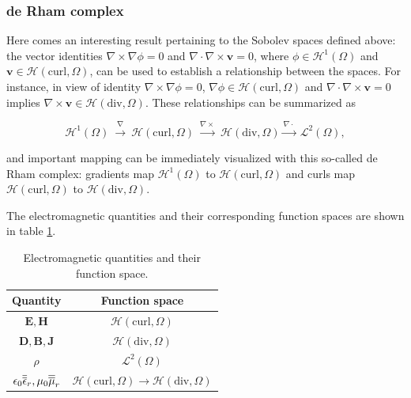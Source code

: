 \subsubsection{de Rham complex}
%
Here comes an interesting result pertaining to the Sobolev spaces defined above: the vector identities $\nabla \times \nabla \phi = 0$ and $\nabla \cdot \nabla \times \mathbf{v} = 0$, where $\phi \in \mathcal{H}^1(\Omega)$ and $\mathbf{v} \in \mathcal{H}(\mathrm{curl},\Omega)$, can be used to establish a relationship between the spaces. For instance, in view of identity $\nabla \times \nabla \phi = 0$, $\nabla \phi \in \mathcal{H}(\mathrm{curl},\Omega)$ and $\nabla \cdot \nabla \times \mathbf{v} = 0$ implies $\nabla \times \mathbf{v} \in \mathcal{H}(\mathrm{div},\Omega)$. These relationships can be summarized as

$$\mathcal{H}^1(\Omega) \ \stackrel{\nabla}{  \longrightarrow} \ \mathcal{H}(\mathrm{curl},\Omega) \ \stackrel{ \nabla\times}{ \longrightarrow} \ \mathcal{H}(\mathrm{div},\Omega) \stackrel{\nabla\cdot}{ \longrightarrow} \ \mathcal{L}^2(\Omega),$$

\noindent and important mapping can be immediately visualized with this so-called de Rham complex: gradients map $\mathcal{H}^1(\Omega)$ to $\mathcal{H}(\mathrm{curl},\Omega)$ and curls map $\mathcal{H}(\mathrm{curl},\Omega)$ to $\mathcal{H}(\mathrm{div},\Omega)$. 

The electromagnetic quantities and their corresponding function spaces are shown in table \ref{tab:quantspace}.


\begin{table}[h!]
\begin{center}
\begin{tabular}{|c|c|}
\hline 
Quantity & Function space \\ 
\hline
\hline 
$\mathbf{E}, \mathbf{H}$ & $\mathcal{H}(\mathrm{curl},\Omega)$ \\ 
\hline 
$\mathbf{D}, \mathbf{B}, \mathbf{J}$ & $\mathcal{H}(\mathrm{div},\Omega)$ \\ 
\hline 
$\rho$ & $\mathcal{L}^2(\Omega)$ \\ 
\hline 
$\epsilon_0 \overline{\overline{\epsilon}}_r, \mu_0 \overline{\overline{\mu}}_r$ & $\mathcal{H}(\mathrm{curl},\Omega) \longrightarrow \mathcal{H}(\mathrm{div},\Omega)$ \\ 
\hline 
\end{tabular}
\end{center}
\caption{Electromagnetic quantities and their function space.}
\label{tab:quantspace}
\end{table}

